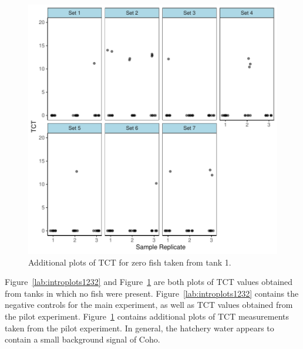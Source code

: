 \begin{figure}[H]
\includegraphics{Chapter3Images/gz3.pdf}
\begin{center}
\caption{\hspace{1mm}Additional plots of TCT for zero fish taken from tank 1. }
\label{lab:introplots123222}
\end{center}
\end{figure}





Figure~\ref{lab:introplots1232} and Figure~\ref{lab:introplots123222} are both plots of TCT values obtained from tanks in which no fish were present. Figure~\ref{lab:introplots1232} contains the negative controls for the main experiment, as well as TCT values obtained from the pilot experiment. Figure~\ref{lab:introplots123222} contains additional plots of TCT measurements taken from the pilot experiment. In general, the hatchery water appears to contain a small background signal of Coho. 